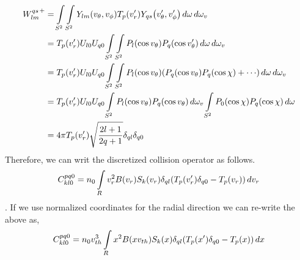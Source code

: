 \documentclass{article}[draft]
\begin{document}
\begin{align*}
{W^{qs}_{lm}}^+ &= \myint_{S^2} \myint_{S^2}  Y_{lm}\of{v_\theta,v_\phi} T_{p}\of{v^\prime_r} Y_{qs}\of{v^\prime_\theta, v^\prime_\phi} \diff{\omega} \diff{\omega_{v}}\\
& = T_{p}\of{v^\prime_r} U_{l0} U_{q0} \myint_{S^2} \myint_{S^2}  P_l\of{\cos v_\theta} P_q\of{\cos v^\prime_\theta} \diff{\omega} \diff{\omega_{v}} \\
& = T_{p}\of{v^\prime_r} U_{l0} U_{q0} \myint_{S^2} \myint_{S^2}  P_l\of{\cos v_\theta} \of{P_q\of{\cos v_\theta} P_q\of{\cos \chi} + \cdots} \diff{\omega} \diff{\omega_{v}} \\
& = T_{p}\of{v^\prime_r} U_{l0} U_{q0} \myint_{S^2} P_l\of{\cos v_\theta} P_q\of{\cos v_\theta} \diff{\omega_{v}} \myint_{S^2} P_0\of{\cos \chi}P_q\of{\cos \chi} \diff{\omega}\\
& = 4\pi T_{p}\of{v^\prime_r} \sqrt{\frac{2l+1}{2q+1}} \delta_{ql} \delta_{q0}
\end{align*}Therefore, we can writ the discretized collision operator as follows. 
\begin{align*}
C^{pq0}_{kl0}  = n_0 \myint_{R} v_r^2 B(v_r) S_k\of{v_r} \delta_{ql} \of{T_p\of{v^\prime_r}\delta_{q0} - T_p\of{v_r}} \diff{v_r} 
\end{align*}. If we use normalized coordinates for the radial direction we can re-write the above as,
\begin{align*}
C^{pq0}_{kl0}  = n_0 v_{th}^3 \myint_{R} x^2 B(x v_{th}) S_k\of{x} \delta_{ql} \of{T_p\of{x^\prime}\delta_{q0} - T_p\of{x}} \diff{x}  
\end{align*}
\end{document}
